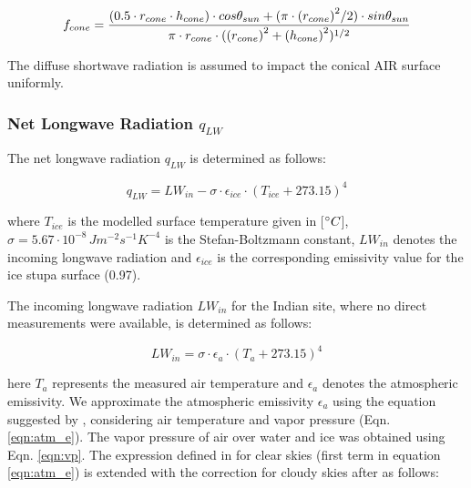 \begin{equation}
	\begin{split}
		f_{cone}& =\frac{(0.5 \cdot r_{cone} \cdot h_{cone}) \cdot cos \theta_{sun} +(\pi \cdot
		{(r_{cone})}^2/2) \cdot sin \theta_{sun} }{\pi \cdot r_{cone} \cdot ({(r_{cone})}^2+{(h_{cone})}^2)^{1/2}}\\
	\end{split}
	\label{eqn:f_{cone} }
\end{equation}

The diffuse shortwave radiation is assumed to impact the conical AIR surface uniformly.

\subsubsection{Net Longwave Radiation \texorpdfstring{$q_{LW}$}{Lg}} \label{sec:LW}

The net longwave radiation $q_{LW}$ is determined as follows:

\begin{equation}
	q_{LW}= LW_{in}-\sigma \cdot \epsilon_{ice} \cdot {(T_{ice}+ 273.15)}^4
	\label{eqn:LW}
\end{equation}

where $T_{ice}$ is the modelled surface temperature given in [$^{\circ} C$],
$\sigma=5.67\cdot10^{-8}\,Jm^{-2}s^{-1}K^{-4}$ is the Stefan-Boltzmann constant, $LW_{in}$ denotes the incoming
longwave radiation and $\epsilon_{ice}$ is the corresponding emissivity value for the ice stupa surface (0.97).

The incoming longwave radiation $LW_{in}$ for the Indian site, where no direct measurements were available, is
determined as follows:

\begin{equation}
	LW_{in}=\sigma \cdot \epsilon_a \cdot {(T_a+ 273.15)}^4
	\label{eqn:LWin}
\end{equation}

here $T_a$ represents the measured air temperature and $\epsilon_a$ denotes the atmospheric emissivity. We
approximate the atmospheric emissivity $\epsilon_a$ using the equation suggested by \cite{brutsaertEvaporationAtmosphereTheory1982},
considering air temperature and vapor pressure (Eqn.  \ref{eqn:atm_e}). The vapor pressure of air over water and
ice was obtained using Eqn. \ref{eqn:vp}.  The expression defined in \cite{brutsaertDerivableFormulaLongwave1975} for clear skies
(first term in equation \ref{eqn:atm_e}) is extended with the correction for cloudy skies after
\cite{brutsaertEvaporationAtmosphereTheory1982} as follows:

